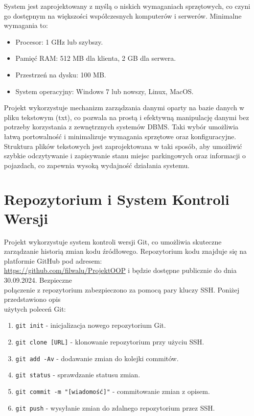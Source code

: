 System jest zaprojektowany z myślą o niskich wymaganiach sprzętowych, co czyni go dostępnym na większości współczesnych komputerów i serwerów. Minimalne wymagania to:
\begin{itemize}
    \item Procesor: 1 GHz lub szybszy.
    \item Pamięć RAM: 512 MB dla klienta, 2 GB dla serwera.
    \item Przestrzeń na dysku: 100 MB.
    \item System operacyjny: Windows 7 lub nowszy, Linux, MacOS.
\end{itemize}

Projekt wykorzystuje mechanizm zarządzania danymi oparty na bazie danych w pliku tekstowym (txt), co pozwala na prostą i efektywną manipulację danymi bez potrzeby korzystania z zewnętrznych systemów DBMS. Taki wybór umożliwia łatwą portowalność i minimalizuje wymagania sprzętowe oraz konfiguracyjne. Struktura plików tekstowych jest zaprojektowana w taki sposób, aby umożliwić szybkie odczytywanie i zapisywanie stanu miejsc parkingowych oraz informacji o pojazdach, co zapewnia wysoką wydajność działania systemu.

\section{Repozytorium i System Kontroli Wersji}

Projekt wykorzystuje system kontroli wersji Git, co umożliwia skuteczne zarządzanie historią zmian kodu źródłowego. Repozytorium kodu znajduje się na platformie GitHub pod adresem:\\ \url{https://github.com/filwalu/ProjektOOP} i będzie dostępne publicznie do dnia 30.09.2024. Bezpieczne\\ połączenie z repozytorium zabezpieczono za pomocą pary kluczy SSH. Poniżej przedstawiono opis\\ użytych poleceń Git:

\begin{enumerate}
    \item \texttt{git init} - inicjalizacja nowego repozytorium Git.
    \item \texttt{git clone [URL]} - klonowanie repozytorium przy użyciu SSH.
    \item \texttt{git add -Av} - dodawanie zmian do kolejki commitów.
    \item \texttt{git status} - sprawdzanie statusu zmian.
    \item \texttt{git commit -m "[wiadomość]"} - commitowanie zmian z opisem.
    \item \texttt{git push} - wysyłanie zmian do zdalnego repozytorium przez SSH.
\end{enumerate}